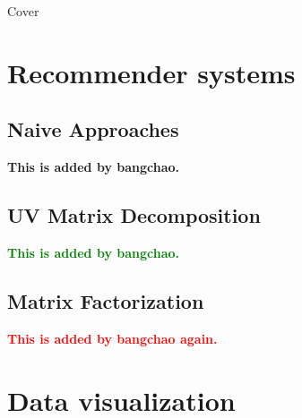 \documentclass[12pt]{article}
\begin{document}
\thispagestyle{empty}
\begin{center}
\Huge    Cover
\end{center}

\newpage
\thispagestyle{empty}
\tableofcontents

\newpage
\section{Recommender systems}
\subsection{Naive Approaches}
\textbf{This is added by bangchao.}

\subsection{UV Matrix Decomposition}
\textcolor{green}{\textbf{This is added by bangchao.}}
\subsection{Matrix Factorization}
\textcolor{red}{\textbf{This is added by bangchao again.}}
\section{Data visualization}
\end{document}
